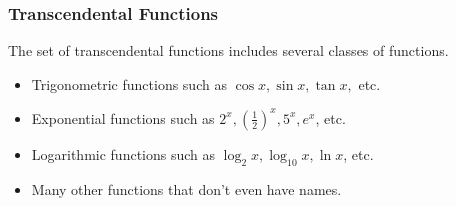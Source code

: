 \begin{frame}
\frametitle{Transcendental Functions}
The set of transcendental functions includes several classes of functions.
\begin{itemize}
\item<2->  Trigonometric functions such as $\cos x, \sin x, \tan x,$ etc.
\item<3->  Exponential functions such as $2^x, \left( \frac{1}{2}\right)^x, 5^x, e^x$, etc.
\item<4->  Logarithmic functions such as $\log_2x, \log_{10}x, \ln x$, etc.
\item<5->  Many other functions that don't even have names.
\end{itemize}
\end{frame}
